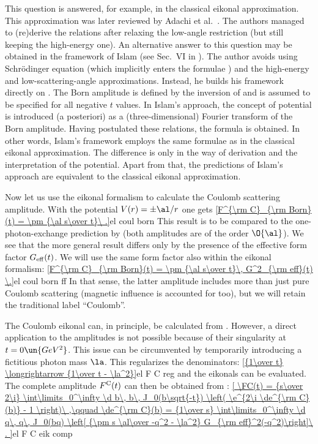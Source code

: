 This question is answered, for example, in the classical eikonal approximation. This approximation was later reviewed by Adachi et al.~. The authors managed to (re)derive the relations  after relaxing the low-angle restriction (but still keeping the high-energy one). An alternative answer to this question may be obtained in the framework of Islam (see Sec.~VI in ). The author avoids using Schr\" odinger equation (which implicitly enters the formulae ) and the high-energy and low-scattering-angle approximations. Instead, he builds his framework directly on . The Born amplitude is defined by the inversion of  and is assumed to be specified for all negative $t$ values. In Islam's approach, the concept of potential is introduced (a posteriori) as a (three-dimensional) Fourier transform of the Born amplitude. Having postulated these relations, the formula  is obtained. In other words, Islam's framework employs the same formulae  as in the classical eikonal approximation. The difference is only in the way of derivation and the interpretation of the potential. Apart from that, the predictions of Islam's approach are equivalent to the classical eikonal approximation.

Now let us use the eikonal formalism to calculate the Coulomb scattering amplitude. With the potential $V(r) = \pm \al/r$ one gets
\eqref{F^{\rm C}_{\rm Born}(t) = \pm {\al s\over t}\ .}{el coul born}
This result is to be compared to the one-photon-exchange prediction by   (both amplitudes are of the order $\O{\al}$). We see that the more general  result differs only by the presence of the effective form factor $G_{\rm eff}(t)$. We will use the same form factor also within the eikonal formalism:
\eqref{F^{\rm C}_{\rm Born}(t) = \pm {\al s\over t}\, G^2_{\rm eff}(t) \.}{el coul born ff}
In that sense, the latter amplitude includes more than just pure Coulomb scattering (magnetic influence is accounted for too), but we will retain the traditional label ``Coulomb''.

The Coulomb eikonal can, in principle, be calculated from . However, a direct application to the amplitudes  is not possible because of their singularity at $t=0\un{GeV^2}$. This issue can be circumvented by temporarily introducing a fictitious photon mass $\la$. This regularizes the denominators:
\eqref{{1\over t} \longrightarrow {1\over t - \la^2}}{el F C reg}
and the eikonals can be evaluated. The complete amplitude $F^{\rm C}(t)$ can then be obtained from :
\eqref{
	\FC(t) = {s\over 2\i} \int\limits_0^\infty \d b\, b\, J_0(b\sqrt{-t}) \left( \e^{2\i \de^{\rm C}(b)} - 1 \right)\ ,\qquad
	\de^{\rm C}(b) = {1\over s} \int\limits_0^\infty \d q\, q\, J_0(bq) \left[ {\pm s \al\over -q^2 - \la^2} G_{\rm eff}^2(-q^2)\right]\ .
}{el F C eik comp}

